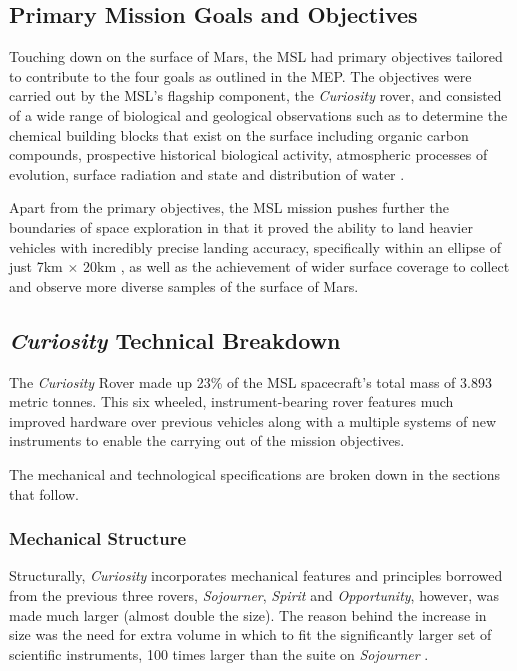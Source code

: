     \subsection{Primary Mission Goals and Objectives}
      Touching down on the surface of Mars, the MSL had primary objectives tailored to contribute to the four goals as outlined in the MEP. The objectives were carried out by the MSL's flagship component, the \textit{Curiosity} rover, and consisted of a wide range of biological and geological observations such as to determine the chemical building blocks that exist on the surface including organic carbon compounds, prospective historical biological activity, atmospheric processes of evolution, surface radiation and state and distribution of water \cite{mslobjectivesjpl}.
      
      Apart from the primary objectives, the MSL mission pushes further the boundaries of space exploration in that it proved the ability to land heavier vehicles with incredibly precise landing accuracy, specifically within an ellipse of just 7km $\times$ 20km \cite{gwebster_2012}, as well as the achievement of wider surface coverage to collect and observe more diverse samples of the surface of Mars.
              
    \subsection{\textit{Curiosity} Technical Breakdown}
      The \textit{Curiosity} Rover made up 23\% of the MSL spacecraft's total mass of 3.893 metric tonnes. This six wheeled, instrument-bearing rover features much improved hardware over previous vehicles along with a multiple systems of new instruments to enable the carrying out of the mission objectives.
      
      The mechanical and technological specifications are broken down in the sections that follow.
      
      \subsubsection{Mechanical Structure}
        Structurally, \textit{Curiosity} incorporates mechanical features and principles borrowed from the previous three rovers, \textit{Sojourner}, \textit{Spirit} and \textit{Opportunity}, however, was made much larger (almost double the size). The reason behind the increase in size was the need for extra volume in which to fit the significantly larger set of scientific instruments, 100 times larger than the suite on \textit{Sojourner} \cite{planetary2011}.
        

